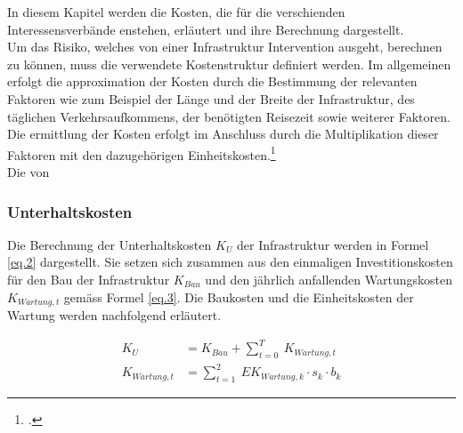 %
%
%
%

\label{subsec:Kosten}

\newpage

In diesem Kapitel werden die Kosten, die für die verschienden Interessensverbände enstehen, erläutert und ihre Berechnung dargestellt.  \\
Um das Risiko, welches von einer Infrastruktur Intervention ausgeht, berechnen zu können, muss die verwendete Kostenstruktur definiert werden. 
Im allgemeinen erfolgt die approximation der Kosten durch die Bestimmung der relevanten Faktoren wie zum Beispiel der Länge und der Breite der Infrastruktur, des täglichen Verkehrsaufkommens, der benötigten Reisezeit sowie weiterer Faktoren. Die ermittlung der Kosten erfolgt im Anschluss durch die Multiplikation dieser Faktoren mit den dazugehörigen Einheitskosten.\footcite{Adey2012} \\
Die von 


\subsubsection{Unterhaltskosten}
\label{subsub:Unterhalt}

Die Berechnung der Unterhaltskosten $K_{U}$ der Infrastruktur werden in Formel \ref{eq.2} dargestellt. Sie setzen sich zusammen aus den einmaligen Investitionskosten für den Bau der Infrastruktur $K_{Bau}$ und den jährlich anfallenden Wartungskosten $K_{Wartung,t}$ gemäss Formel \ref{eq.3}. Die Baukosten und die Einheitskosten der Wartung werden nachfolgend erläutert.


\begin{align}
K_{U} &= K_{Bau} + \sum_{t=0}^T \  K_{Wartung,t}  \label{eq.2} \\
K_{Wartung,t} &= \sum_{t=1}^2 \ EK_{Wartung,k} \cdot s_{k} \cdot b_{k}  \label{eq.3} 
\end{align}

